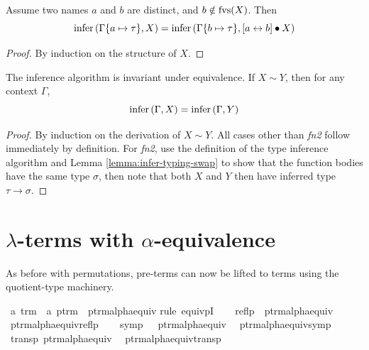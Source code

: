 \begin{lemma}
\label{lemma:infer-typing-swap}
Assume two names \(a\) and \(b\) are distinct, and \(b \notin \mathrm{fvs}(X)\).
Then
\[
\mathrm{infer}\left(\Gamma\{a \mapsto \tau\}, X\right) = \mathrm{infer}\left(\Gamma\{b \mapsto \tau\}, [a \leftrightarrow b] \bullet X\right)
\]
\end{lemma}
\begin{proof}
By induction on the structure of \(X\).
\end{proof}

\begin{theorem}
The inference algorithm is invariant under equivalence.
If \(X \sim Y\), then for any context \(\Gamma\),
\[
\mathrm{infer}\left(\Gamma, X\right) = \mathrm{infer}\left(\Gamma, Y\right)
\]
\end{theorem}
\begin{proof}
By induction on the derivation of \(X \sim Y\).
All cases other than \emph{fn2} follow immediately by definition.
For \emph{fn2}, use the definition of the type inference algorithm and Lemma \ref{lemma:infer-typing-swap} to show that the function bodies have the same type \(\sigma\), then note that both \(X\) and \(Y\) then have inferred type \(\tau \to \sigma\).
\end{proof}

\section{\(\lambda\)-terms with \(\alpha\)-equivalence}
As before with permutations, pre-terms can now be lifted to terms using the quotient-type machinery.

\begin{implementation}
\isamarkupfalse%
\ {\isacharprime}a\ trm\ {\isacharequal}\ {\isachardoublequoteopen}{\isacharprime}a\ ptrm{\isachardoublequoteclose}\ {\isacharslash}\ ptrm{\isacharunderscore}alpha{\isacharunderscore}equiv\isanewline
%
\isadelimproof
%
\endisadelimproof
%
\isatagproof
{}\isamarkupfalse%
{\isacharparenleft}rule\ equivpI{\isacharparenright}\isanewline
\ \ \isamarkupfalse%
\ {\isachardoublequoteopen}reflp\ \ ptrm{\isacharunderscore}alpha{\isacharunderscore}equiv{\isachardoublequoteclose}\ \isamarkupfalse%
\ ptrm{\isacharunderscore}alpha{\isacharunderscore}equiv{\isacharunderscore}reflp\isacommand{{\isachardot}}\isamarkupfalse%
\isanewline
\ \ \isamarkupfalse%
\ {\isachardoublequoteopen}symp\ \ \ ptrm{\isacharunderscore}alpha{\isacharunderscore}equiv{\isachardoublequoteclose}\ \isamarkupfalse%
\ ptrm{\isacharunderscore}alpha{\isacharunderscore}equiv{\isacharunderscore}symp\isacommand{{\isachardot}}\isamarkupfalse%
\isanewline
\ \ \isamarkupfalse%
\ {\isachardoublequoteopen}transp\ ptrm{\isacharunderscore}alpha{\isacharunderscore}equiv{\isachardoublequoteclose}\ \isamarkupfalse%
\ ptrm{\isacharunderscore}alpha{\isacharunderscore}equiv{\isacharunderscore}transp\isacommand{{\isachardot}}\isamarkupfalse%
\isanewline
{}\isamarkupfalse%
%
\endisatagproof
\end{implementation}

